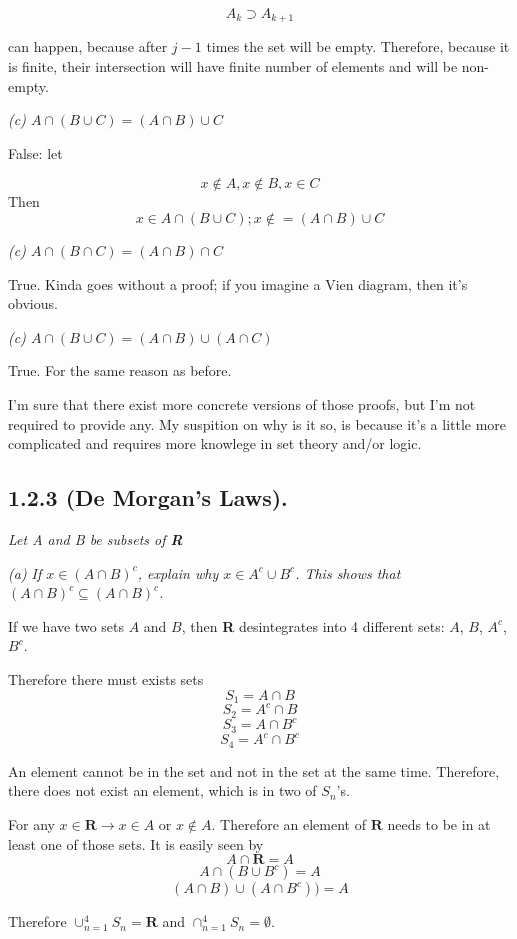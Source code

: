 \documentclass[11pt,oneside,titlepage]{book}
\begin{document}
$$A_k \supset A_{k + 1}$$

can happen, because after $j - 1$ times the set will be empty. Therefore,
because it is finite, their intersection will have finite number of
elements and will be non-empty.

\textit{(c) $A \cap (B \cup C) = (A \cap B) \cup C$}

False: let

$$x \notin A, x \notin B, x \in C$$
Then
$$x \in A \cap (B \cup C); x \notin = (A \cap B) \cup C$$

\textit{(c) $A \cap (B \cap C) = (A \cap B) \cap C$}

True. Kinda goes without a proof; if you imagine a Vien diagram, then it's
obvious.

\textit{(c) $A \cap (B \cup C) = (A \cap B)  \cup (A \cap C)$}

True. For the same reason as before.

I'm sure that there exist more concrete versions of those proofs, but I'm not
required to provide any. My suspition on why is it so, is because it's a
little more complicated and requires more knowlege in set theory and/or logic.

\subsection*{1.2.3 (De Morgan's Laws).}

\textit{Let A and B be subsets of \textbf{R}}

\textit{(a) If $x \in (A \cap B)^c$, explain why $x \in A^c \cup B^c$. This
  shows that $(A \cap B)^c \subseteq (A \cap B)^c$.}

If we have two sets $A$ and $B$, then \textbf{R} desintegrates into 4 different
sets: $A$, $B$, $A^c$, $B^c$.

Therefore there must exists sets
$$S_1 = A \cap B$$
$$S_2 = A^c \cap B$$
$$S_3 = A \cap B^c$$
$$S_4 = A^c \cap B^c$$

An element cannot be in the set and not in the set at the same time. Therefore,
there does not exist an element, which is in two of $S_n$'s.

For any $x \in \textbf{R} \to x \in A$ or $x \notin A$. Therefore an element
of $\textbf{R}$ needs to be in at least one of those sets. It is easily seen by
$$A \cap \textbf{R} = A$$
$$A \cap (B \cup B^c) = A$$
$$(A \cap B) \cup (A \cap B^c)) = A$$

Therefore $\cup_{n = 1}^4 S_n = \textbf{R}$ and
$\cap_{n = 1}^4 S_n = \emptyset$.
\end{document}
